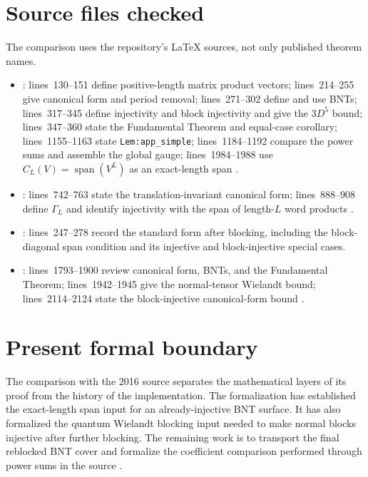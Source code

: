 \documentclass{article}
\begin{document}
\section{Source files checked}

The comparison uses the repository's \LaTeX{} sources, not only published
theorem names.

\begin{itemize}
    \item {}: lines~130--151 define
    positive-length matrix product vectors; lines~214--255 give canonical form
    and period removal; lines~271--302 define and use BNTs; lines~317--345
    define injectivity and block injectivity and give the $3D^5$ bound;
    lines~347--360 state the Fundamental Theorem and equal-case corollary;
    lines~1155--1163 state \texttt{Lem:app\_simple}; lines~1184--1192 compare
    the power sums and assemble the global gauge; lines~1984--1988 use
    $C_L(V)=\operatorname{span}(V^L)$ as an exact-length span
    \cite{Cirac2016MPDO_arXiv}.

    \item {}: lines~742--763 state
    the translation-invariant canonical form; lines~888--908 define
    $\Gamma_L$ and identify injectivity with the span of length-$L$ word
    products \cite{PerezGarcia2007MPSReps}.

    \item {}: lines~247--278 record the
    standard form after blocking, including the block-diagonal span condition
    and its injective and block-injective special cases.

    \item {}: lines~1793--1900 review
    canonical form, BNTs, and the Fundamental Theorem; lines~1942--1945 give
    the normal-tensor Wielandt bound; lines~2114--2124 state the
    block-injective canonical-form bound \cite{Cirac2021Matrix}.
\end{itemize}

\section{Present formal boundary}

The comparison with the 2016 source separates the mathematical layers of its
proof from the history of the implementation. The formalization has established
the exact-length span input for an already-injective BNT surface. It has also
formalized the quantum Wielandt blocking input needed to make normal blocks
injective after further blocking. The remaining work is to transport the final
reblocked BNT cover and formalize the coefficient comparison performed through
power sums in the source \cite{Cirac2016MPDO_arXiv}.
\end{document}
